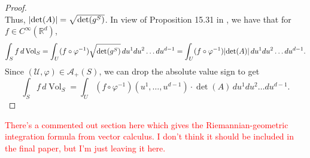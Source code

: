 \documentclass{article}
\renewcommand\det{\operatorname{det}}
\newcommand{\R}{\mathbb{R}}
\theoremstyle{theorem}
\newcommand{\Vol}{\operatorname{Vol}}
\begin{document}
\begin{proof}
\begin{equation*}
\end{equation*}
Thus, $\abs{\det(A)} = \sqrt{\det(g^S)}$. In view of Proposition 15.31 in \cite{lee2013smooth}, we have that for $f\in C^\infty(\R^d)$,
\begin{equation*}
    \int_S f\,d \Vol_S = \int_{U} (f\circ \varphi^{-1}) \sqrt{\det(g^S)} \,du^1du^2 \dots du^{d-1} = \int_{U} (f\circ \varphi^{-1}) \abs{\det(A)} \,du^1du^2 \dots du^{d-1}.
\end{equation*}
Since $(\mathcal{U}, \varphi) \in \mathcal{A}_+(S)$, we can drop the absolute value sign to get 
\begin{equation*}
    \int_S f\,d \Vol_S  = \int_{U} (f\circ \varphi^{-1})(u^1,\dots,u^{d-1}) \cdot {\det(A)} \,du^1du^2 \dots du^{d-1}.
\end{equation*}
\end{proof}





\textcolor{red}{There's a commented out section here which gives the Riemannian-geometric integration formula from vector calculus. I don't think it should be included in the final paper, but I'm just leaving it here.}
\end{document}
